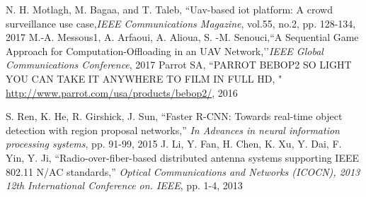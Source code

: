 \documentclass[journal]{IEEEtran}
\begin{document}
\begin{thebibliography}{1}
N. H. Motlagh, M. Bagaa, and T. Taleb, ``Uav-based iot platform: A crowd surveillance use case,\emph{IEEE Communications Magazine}, vol.55, no.2, pp. 128-134, 2017
 M.-A. Messous1, A. Arfaoui, A. Alioua, S. -M. Senouci,``A Sequential Game Approach for Computation-Offloading in an UAV Network,’’\emph{IEEE Global Communications Conference}, 2017 
 Parrot SA, ``PARROT BEBOP2 SO LIGHT YOU CAN TAKE IT
ANYWHERE TO FILM IN FULL HD, "
\url{http://www.parrot.com/usa/products/bebop2/}, 2016

 S. Ren, K. He, R. Girshick, J. Sun, ``Faster R-CNN: Towards
real-time object detection with region proposal networks,'' \emph{In Advances in neural information processing systems}, pp. 91-99, 2015
 J. Li, Y. Fan, H. Chen, K. Xu, Y. Dai, F. Yin, Y. Ji,  ``Radio-over-fiber-based distributed antenna systems supporting IEEE 802.11 N/AC standards,'' \emph{Optical Communications and Networks (ICOCN), 2013 12th International Conference on. IEEE}, pp. 1-4, 2013

\end{thebibliography}

% 


\end{document}
